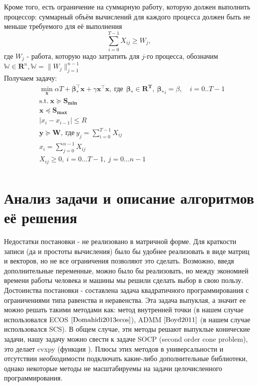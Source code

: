 \documentclass{article}
\begin{document}
Кроме того, есть ограничение на суммарную работу, которую должен выполнить процессор: суммарный объём вычислений для каждого процесса должен быть не меньше требуемого для её выполнения\\
$$\sum \limits_{i=0}^{T-1} X_{ij} \ge W_j,$$ где $W_j$ - работа, которую надо затратить для $j$-го процесса, обозначим $\mathbb{W} \in \mathbf{R}^n, \mathbb{W} = \| W_j \|_{j=1}^{n-1}$\\

Получаем задачу:\\
\begin{equation}
\begin{split}
& \min\limits_{\textbf{x}} \alpha T + \mathbf{\pmb{\beta_{*}^{\top}}x} + \gamma \mathbf{x^{\top}x},~ \text{где}~ \ \pmb{\beta_*} \in \mathbf{R^T}, \  \pmb{\beta_*}_i = \beta, \quad  i = 0..T-1 \\
& \text{s.t.} ~\mathbf{x} \succeq \mathbf{S_{min}}\\ 
& \mathbf{x} \preceq \mathbf{S_{max}} \\
& |x_{i} - x_{i-1}| \le R \\
&\mathbf{y} \succeq \mathbf{W},~ \text{где}~ y_j = \sum\limits_{i=0}^{T-1} X_{ij} \\
& x_i = \sum \limits_{j=0}^{n-1} X_{ij} \\
& X_{ij} \geq 0,~ i = 0\dots T-1,~ j = 0\dots n-1\\
\end{split}
\end{equation}


\section{Анализ задачи и описание алгоритмов её решения}

Недостатки постановки - не реализовано в матричной форме. Для краткости записи (да и простоты вычисления) было бы удобнее реализовать в виде матриц и векторов, но не все ограничения позволяют это сделать. Возможно, введя дополнительные переменные, можно было бы реализовать, но между экономией времени работы человека и машины мы решили сделать выбор в свою пользу.\\

Достоинства постановки - составлена задача квадратичного программирования с ограничениями типа равенства и неравенства. Эта задача выпуклая, а значит ее можно решать такими методами как: метод внутренней точки (в нашем случае использовался ECOS $\cite{Domahidi2013ecos}$), ADMM $\cite{Boyd2011}$ (в нашем случае использовался SCS). В общем случае, эти методы решают выпуклые конические задачи, нашу задачу можно свести к задаче SOCP (second order cone problem), это делает cvxpy (функция ). Плюсы этих методов в универсальности и отсутствии необходимости подключать какие-либо дополнительные библиотеки, однако некоторые методы не масштабируемы на задачи целочисленного программирования. \\
\end{document}
